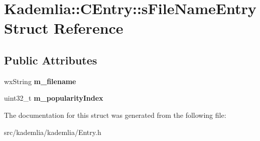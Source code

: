\section{Kademlia::CEntry::sFileNameEntry Struct Reference}
\label{structKademlia_1_1CEntry_1_1sFileNameEntry}
\subsection*{Public Attributes}
\begin{DoxyCompactItemize}
\item 
wxString {\bfseries m\_\-filename}\label{structKademlia_1_1CEntry_1_1sFileNameEntry_a8b6743893abb7c2d385bf4665bdffe96}

\item 
uint32\_\-t {\bfseries m\_\-popularityIndex}\label{structKademlia_1_1CEntry_1_1sFileNameEntry_a56ed8d6a31e70505d73f85f8b79ee16a}

\end{DoxyCompactItemize}


The documentation for this struct was generated from the following file:\begin{DoxyCompactItemize}
\item 
src/kademlia/kademlia/Entry.h\end{DoxyCompactItemize}
